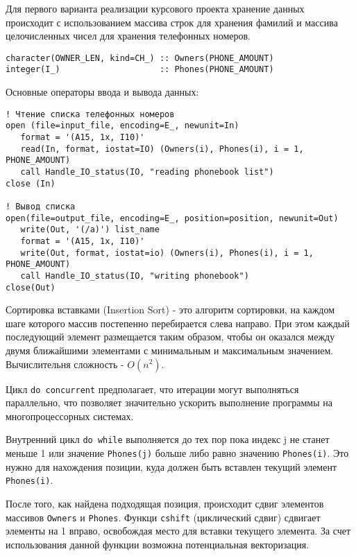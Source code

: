 \documentclass[a4paper,14pt]{article}
\begin{document}
Для первого варианта реализации курсового проекта хранение данных происходит с использованием массива строк для хранения фамилий и массива целочисленных чисел для хранения телефонных номеров. 

\begin{lstlisting}[caption={Инициализация массивов для хранения исходных данных}]
character(OWNER_LEN, kind=CH_) :: Owners(PHONE_AMOUNT)
integer(I_)                    :: Phones(PHONE_AMOUNT)
\end{lstlisting}

Основные операторы ввода и вывода данных:

\begin{lstlisting}[caption={Ввод и вывод данных}]
! Чтение списка телефонных номеров
open (file=input_file, encoding=E_, newunit=In)
   format = '(A15, 1x, I10)'
   read(In, format, iostat=IO) (Owners(i), Phones(i), i = 1, PHONE_AMOUNT)
   call Handle_IO_status(IO, "reading phonebook list")
close (In)

! Вывод списка
open(file=output_file, encoding=E_, position=position, newunit=Out)
   write(Out, '(/a)') list_name
   format = '(A15, 1x, I10)'
   write(Out, format, iostat=io) (Owners(i), Phones(i), i = 1, PHONE_AMOUNT)
   call Handle_IO_status(IO, "writing phonebook")
close(Out)
\end{lstlisting}

Сортировка вставками (Insertion Sort) - это алгоритм сортировки, на каждом шаге которого массив постепенно перебирается слева направо. При этом каждый последующий элемент размещается таким образом, чтобы он оказался между двумя ближайшими элементами с минимальным и максимальным значением. Вычислительня сложность - \( O(n^2) \).

Цикл \texttt{do concurrent} предполагает, что итерации могут выполняться параллельно, что позволяет значительно ускорить выполнение программы на многопроцессорных системах.

Внутренний цикл \texttt{do while} выполняется до тех пор пока индекс j не станет меньше 1 или значение \texttt{Phones(j)} больше либо равно значению \texttt{Phones(i)}. Это нужно для нахождения позиции, куда должен быть вставлен текущий элемент \texttt{Phones(i)}.

После того, как найдена подходящая позиция, происходит сдвиг элементов массивов \texttt{Owners} и \texttt{Phones}. Функци \texttt{cshift} (циклический сдвиг) сдвигает элементы на 1 вправо, освобождая место для вставки текущего элемента. За счет использования данной функции возможна потенциальная векторизация.
\end{document}
